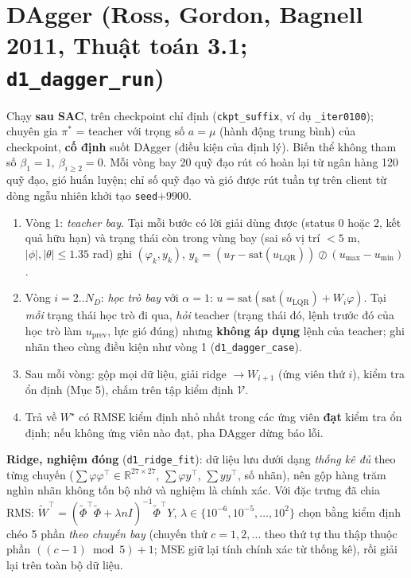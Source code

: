 \documentclass[11pt]{article}
\newcommand{\R}{\mathbb{R}}
\newcommand{\T}{^{\!\top}}
\newcommand{\uL}{u_{\mathrm{LQR}}}
\begin{document}
\section{DAgger (Ross, Gordon, Bagnell 2011, Thuật toán 3.1; \texttt{d1\_dagger\_run})}
Chạy \textbf{sau SAC}, trên checkpoint chỉ định (\texttt{ckpt\_suffix}, ví dụ \texttt{\_iter0100}); chuyên gia $\pi^*$ =
teacher với trọng số $a=\mu$ (hành động trung bình) của checkpoint, \textbf{cố định} suốt DAgger (điều kiện của định lý).
Biến thể không tham số $\beta_1=1,\ \beta_{i\ge2}=0$. Mỗi vòng bay 20 quỹ đạo rút có hoàn lại từ ngân hàng 120 quỹ đạo,
gió huấn luyện; chỉ số quỹ đạo và gió được rút tuần tự trên client từ dòng ngẫu nhiên khởi tạo \texttt{seed}$+9900$.
\begin{enumerate}[leftmargin=1.6em,itemsep=1pt]
\item Vòng 1: \emph{teacher bay}. Tại mỗi bước có lời giải dùng được (status 0 hoặc 2, kết quả hữu hạn) và trạng thái còn
trong vùng bay (sai số vị trí $<5$ m, $|\phi|,|\theta|\le1.35$ rad) ghi $(\varphi_k,y_k)$,
$y_k=(u_T-\mathrm{sat}(\uL))\oslash(u_{\max}-u_{\min})$.
\item Vòng $i=2..N_D$: \emph{học trò bay} với $\alpha=1$: $u=\mathrm{sat}(\mathrm{sat}(\uL)+W_i\varphi)$. Tại \emph{mỗi}
trạng thái học trò đi qua, \emph{hỏi} teacher (trạng thái đó, lệnh trước đó của học trò làm $u_{\mathrm{prev}}$, lực gió
đúng) nhưng \textbf{không áp dụng} lệnh của teacher; ghi nhãn theo cùng điều kiện như vòng 1 (\texttt{d1\_dagger\_case}).
\item Sau mỗi vòng: gộp mọi dữ liệu, giải ridge $\to W_{i+1}$ (ứng viên thứ $i$), kiểm tra ổn định (Mục 5), chấm trên tập
kiểm định $\mathcal V$.
\item Trả về $W^\star$ có RMSE kiểm định nhỏ nhất trong các ứng viên \textbf{đạt} kiểm tra ổn định; nếu không ứng viên nào
đạt, pha DAgger dừng báo lỗi.
\end{enumerate}
\textbf{Ridge, nghiệm đóng} (\texttt{d1\_ridge\_fit}): dữ liệu lưu dưới dạng \emph{thống kê đủ} theo từng chuyến
($\sum\varphi\varphi\T\in\R^{27\times27}$, $\sum\varphi y\T$, $\sum yy\T$, số nhãn), nên gộp hàng trăm nghìn nhãn không tốn
bộ nhớ và nghiệm là chính xác. Với đặc trưng đã chia RMS: $\tilde W\T=(\tilde\Phi\T\tilde\Phi+\lambda nI)^{-1}\tilde\Phi\T Y$,
$\lambda\in\{10^{-6},10^{-5},\dots,10^{2}\}$ chọn bằng kiểm định chéo 5 phần \emph{theo chuyến bay} (chuyến thứ $c=1,2,\dots$ theo thứ tự
thu thập thuộc phần $((c-1)\bmod 5)+1$; MSE giữ lại tính chính xác từ thống kê), rồi giải lại trên toàn bộ dữ liệu.
\end{document}
